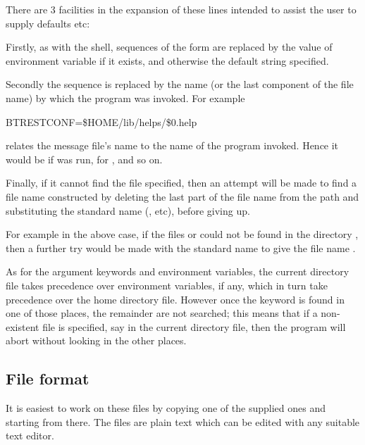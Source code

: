 There are 3 facilities in the expansion of these lines intended to assist the user to supply defaults etc:

Firstly, as with the shell, sequences of the form  are replaced by the value of
environment variable  if it exists, and otherwise the default string specified.

Secondly the sequence  is replaced by the name (or the last component of the file name) by which the program was
invoked. For example

\begin{expara}

BTRESTCONF=\$HOME/lib/helps/\$0.help

\end{expara}

relates the message file's name to the name of the program invoked. Hence it would be  if
\PrBtjlist{} was run,  for \PrBtvar{}, and so on.

Finally, if it cannot find the file specified, then an attempt will be made to find a file name constructed by deleting the last part of the
file name from the path and substituting the standard name (,  etc),
before giving up.

For example in the above case, if the files  or 
could not be found in the directory , then a further try would be
made with the standard name  to give the file name .

As for the argument keywords and environment variables, the current directory \configurationfile{} file takes precedence over
environment variables, if any, which in turn take precedence over the home directory \homeconfigpath{} file. However once the
keyword is found in one of those places, the remainder are not searched; this means that if a non-existent file is specified, say in
the current directory \configurationfile file{}, then the program will abort without looking in the other places.

\subsection{File format}
It is easiest to work on these files by copying one of the supplied ones and starting from there. The files are plain text which can be edited
with any suitable text editor.

